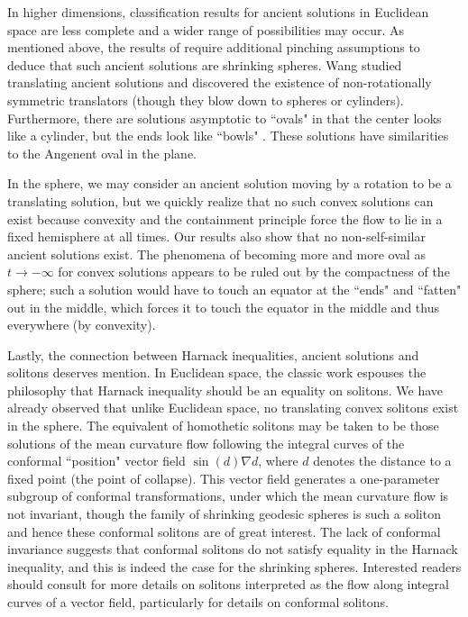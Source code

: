 \documentclass{amsart}
\theoremstyle{definition}
\theoremstyle{remark}
\numberwithin{equation}{section}
\begin{document}
In higher dimensions, classification results for ancient solutions in Euclidean space are less complete and a wider range of possibilities may occur. As mentioned above, the results of \cite{Hu-Sin 2014} require additional pinching assumptions to deduce that such ancient solutions are shrinking spheres. Wang \cite{Wang} studied translating ancient solutions and discovered the existence of non-rotationally symmetric translators (though they blow down to spheres or cylinders). Furthermore, there are solutions asymptotic to ``ovals" in that the center looks like a cylinder, but the ends look like ``bowls" \cite{Ang,Has-Her,Whi}. These solutions have similarities to the Angenent oval in the plane.

In the sphere, we may consider an ancient solution moving by a rotation to be a translating solution, but we quickly realize that no such convex solutions can exist because convexity and the containment principle force the flow to lie in a fixed hemisphere at all times. Our results also show that no non-self-similar ancient solutions exist. The phenomena of becoming more and more oval as $t\to -\infty$ for convex solutions appears to be ruled out by the compactness of the sphere; such a solution would have to touch an equator at the ``ends" and ``fatten" out in the middle, which forces it to touch the equator in the middle and thus everywhere (by convexity).

Lastly, the connection between Harnack inequalities, ancient solutions and solitons deserves mention. In Euclidean space, the classic work \cite{Hamilton 95} espouses the philosophy that Harnack inequality should be an equality on solitons. We have already observed that unlike Euclidean space, no translating convex solitons exist in the sphere. The equivalent of homothetic solitons may be taken to be those solutions of the mean curvature flow following the integral curves of the conformal ``position" vector field $\sin(d)\nabla d$, where $d$ denotes the distance to a fixed point (the point of collapse). This vector field generates a one-parameter subgroup of conformal transformations, under which the mean curvature flow is not invariant, though the family of shrinking geodesic spheres is such a soliton and hence these conformal solitons are of great interest. The lack of conformal invariance suggests that conformal solitons do not satisfy equality in the Harnack inequality, and this is indeed the case for the shrinking spheres. Interested readers should consult \cite{hun-nor 12,smo 97, smo 01} for more details on solitons interpreted as the flow along integral curves of a vector field, particularly \cite{arr-sun 13} for details on conformal solitons.
\end{document}
